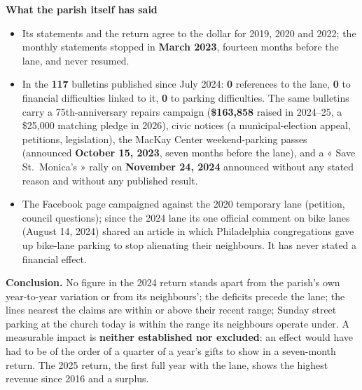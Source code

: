 \documentclass[10pt,letterpaper]{article}
\newcommand{\B}[1]{\textbf{#1}}
\begin{document}
\textbf{What the parish itself has said}
\begin{itemize}[nosep,leftmargin=1.2em]
\item Its statements and the return agree to the dollar for 2019, 2020 and 2022; the monthly statements stopped in \B{March 2023}, fourteen months before the lane, and never resumed.
\item In the \B{117} bulletins published since July 2024: \B{0} references to the lane, \B{0} to financial difficulties linked to it, \B{0} to parking difficulties. The same bulletins carry a 75th-anniversary repairs campaign (\B{\$163,858} raised in 2024--25, a \$25,000 matching pledge in 2026), civic notices (a municipal-election appeal, petitions, legislation), the MacKay Center weekend-parking passes (announced \B{October 15, 2023}, seven months before the lane), and a « Save St.~Monica's » rally on \B{November 24, 2024} announced without any stated reason and without any published result.
\item The Facebook page campaigned against the 2020 temporary lane (petition, council questions); since the 2024 lane its one official comment on bike lanes (August 14, 2024) shared an article in which Philadelphia congregations gave up bike-lane parking to stop alienating their neighbours. It has never stated a financial effect.
\end{itemize}

\textbf{Conclusion.} No figure in the 2024 return stands apart from the parish's own year-to-year variation or from its neighbours'; the deficits precede the lane; the lines nearest the claims are within or above their recent range; Sunday street parking at the church today is within the range its neighbours operate under. A measurable impact is \B{neither established nor excluded}: an effect would have had to be of the order of a quarter of a year's gifts to show in a seven-month return. The 2025 return, the first full year with the lane, shows the highest revenue since 2016 and a surplus.
\end{document}
